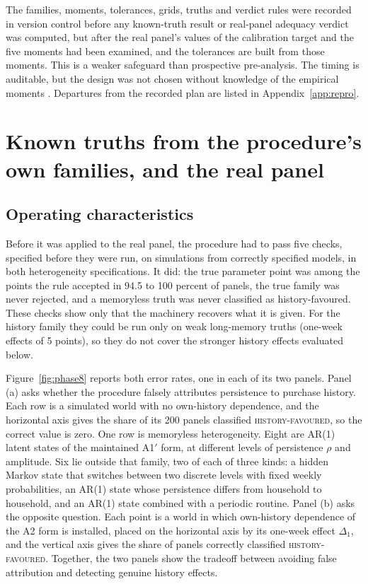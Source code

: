 \documentclass[11pt]{article}
\newcommand{\verdict}[1]{\textsc{#1}}
\begin{document}
The families, moments, tolerances, grids, truths and verdict rules were recorded in version
control before any known-truth result or real-panel adequacy verdict was computed, but after
the real panel's values of the calibration target and the five moments had been examined, and
the tolerances are built from those moments.
This is a weaker safeguard than prospective pre-analysis. The timing is auditable, but the
design was not chosen without knowledge of the empirical moments
\citep{olken2015,christensen_miguel}. Departures from the recorded plan are listed in
Appendix~\ref{app:repro}.

\section{Known truths from the procedure's own families, and the real panel}
\label{sec:phase8}

\subsection{Operating characteristics}

Before it was applied to the real panel, the procedure had to pass five checks, specified
before they were run, on simulations from correctly specified models, in both heterogeneity
specifications. It did:
the true parameter point was among the points the rule accepted in 94.5 to 100 percent of
panels, the true family was never rejected, and a memoryless truth was never classified as
history-favoured. These checks show only that the machinery recovers what it is given. For the
history family they could be run only on weak long-memory truths (one-week effects of 5 points),
so they do not cover the stronger history effects evaluated below.

Figure~\ref{fig:phase8} reports both error rates, one in each of its two panels. Panel (a) asks whether the
procedure falsely attributes persistence to purchase history. Each row is a simulated world
with no own-history dependence, and the horizontal axis gives the share of its 200 panels
classified \verdict{history-favoured}, so the correct value is zero. One row is memoryless
heterogeneity. Eight are AR(1) latent states of the maintained A1$'$ form, at different levels
of persistence $\rho$ and amplitude. Six lie outside that family, two of each of three kinds:
a hidden Markov state that switches between two discrete levels with fixed weekly
probabilities, an AR(1) state whose persistence differs from household to household, and an
AR(1) state combined with a periodic routine. Panel (b) asks the opposite question. Each point
is a world in which own-history dependence of the A2 form is installed, placed on the
horizontal axis by its one-week effect $\Delta_1$, and the vertical axis gives the share of
panels correctly classified \verdict{history-favoured}. Together, the two panels show the
tradeoff between avoiding false attribution and detecting genuine history effects.
\end{document}
